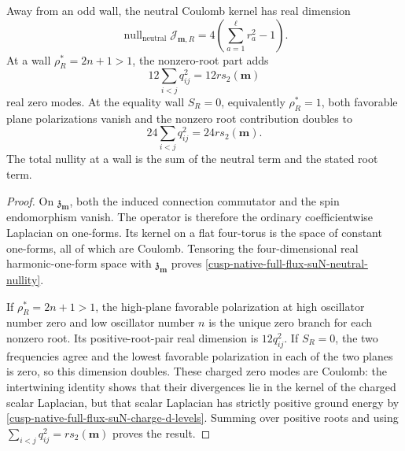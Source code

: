 \begin{theorem}
\label{cusp-native-full-flux-suN-nullity-theorem}
Away from an odd wall, the neutral Coulomb kernel has real dimension
\begin{equation}
 \operatorname{null}_{\mathrm{neutral}}\mathcal J_{\mathbf m,R}
 =4\left(\sum_{a=1}^{\ell}r_a^2-1\right).
 \label{cusp-native-full-flux-suN-neutral-nullity}
\end{equation}
At a wall \(\rho_R^*=2n+1>1\), the nonzero-root part adds
\begin{equation}
 12\sum_{i<j}q_{ij}^2=12r s_2(\mathbf m)
 \label{cusp-native-full-flux-suN-odd-wall-nullity}
\end{equation}
real zero modes.  At the equality wall \(S_R=0\), equivalently
\(\rho_R^*=1\), both favorable plane polarizations vanish and the nonzero
root contribution doubles to
\begin{equation}
 24\sum_{i<j}q_{ij}^2=24r s_2(\mathbf m).
 \label{cusp-native-full-flux-suN-equality-wall-nullity}
\end{equation}
The total nullity at a wall is the sum of the neutral term and the stated
root term.
\end{theorem}

\begin{proof}
On \(\mathfrak z_{\mathbf m}\), both the induced connection commutator and
the spin endomorphism vanish.  The operator is therefore the ordinary
coefficientwise Laplacian on one-forms.  Its kernel on a flat four-torus is
the space of constant one-forms, all of which are Coulomb.  Tensoring the
four-dimensional real harmonic-one-form space with
\(\mathfrak z_{\mathbf m}\) proves
\cref{cusp-native-full-flux-suN-neutral-nullity}.

If \(\rho_R^*=2n+1>1\), the high-plane favorable polarization at high
oscillator number zero and low oscillator number \(n\) is the unique zero
branch for each nonzero root.  Its positive-root-pair real dimension is
\(12q_{ij}^2\).  If \(S_R=0\), the two frequencies agree and the lowest
favorable polarization in each of the two planes is zero, so this dimension
doubles.  These charged zero modes are Coulomb: the intertwining identity
shows that their divergences lie in the kernel of the charged scalar
Laplacian, but that scalar Laplacian has strictly positive ground energy by
\cref{cusp-native-full-flux-suN-charge-d-levels}.  Summing over positive
roots and using
\(\sum_{i<j}q_{ij}^2=rs_2(\mathbf m)\) proves the result.
\end{proof}

